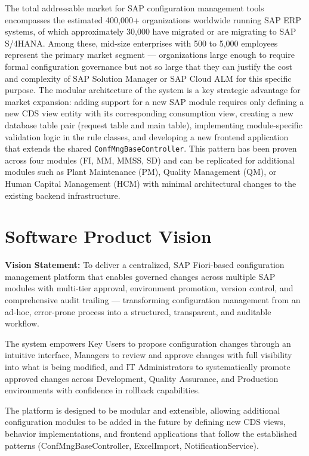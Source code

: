 \documentclass[12pt,a4paper]{report}
\begin{document}
The total addressable market for SAP configuration management tools encompasses the estimated 400,000+ organizations worldwide running SAP ERP systems, of which approximately 30,000 have migrated or are migrating to SAP S/4HANA. Among these, mid-size enterprises with 500 to 5,000 employees represent the primary market segment --- organizations large enough to require formal configuration governance but not so large that they can justify the cost and complexity of SAP Solution Manager or SAP Cloud ALM for this specific purpose. The modular architecture of the system is a key strategic advantage for market expansion: adding support for a new SAP module requires only defining a new CDS view entity with its corresponding consumption view, creating a new database table pair (request table and main table), implementing module-specific validation logic in the rule classes, and developing a new frontend application that extends the shared \texttt{ConfMngBaseController}. This pattern has been proven across four modules (FI, MM, MMSS, SD) and can be replicated for additional modules such as Plant Maintenance (PM), Quality Management (QM), or Human Capital Management (HCM) with minimal architectural changes to the existing backend infrastructure.


\section{Software Product Vision}

\textbf{Vision Statement:} To deliver a centralized, SAP Fiori-based configuration management platform that enables governed changes across multiple SAP modules with multi-tier approval, environment promotion, version control, and comprehensive audit trailing --- transforming configuration management from an ad-hoc, error-prone process into a structured, transparent, and auditable workflow.

The system empowers Key Users to propose configuration changes through an intuitive interface, Managers to review and approve changes with full visibility into what is being modified, and IT Administrators to systematically promote approved changes across Development, Quality Assurance, and Production environments with confidence in rollback capabilities.

The platform is designed to be modular and extensible, allowing additional configuration modules to be added in the future by defining new CDS views, behavior implementations, and frontend applications that follow the established patterns (ConfMngBaseController, ExcelImport, NotificationService).
\end{document}
